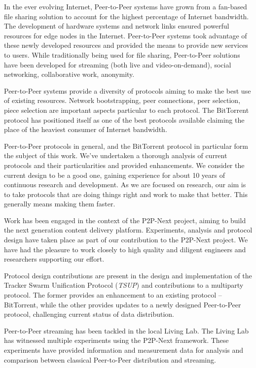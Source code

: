 
In the ever evolving Internet, Peer-to-Peer systems have grown from a
fan-based file sharing solution to account for the highest percentage of
Internet bandwidth. The development of hardware systems and network links
ensured powerful resources for edge nodes in the Internet. Peer-to-Peer
systems took advantage of these newly developed resources and provided the
means to provide new services to users. While traditionally being used for
file sharing, Peer-to-Peer solutions have been developed for streaming (both
live and video-on-demand), social networking, collaborative work, anonymity.

Peer-to-Peer systems provide a diversity of protocols aiming to make the best
use of existing resources. Network bootstrapping, peer connections, peer
selection, piece selection are important aspects particular to each protocol.
The BitTorrent protocol has positioned itself as one of the best protocols
available claiming the place of the heaviest consumer of Internet bandwidth.

Peer-to-Peer protocols in general, and the BitTorrent protocol in particular
form the subject of this work. We've undertaken a thorough analysis of current
protocols and their particularities and provided enhancements. We consider the
current design to be a good one, gaining experience for about 10 years of
continuous research and development. As we are focused on research, our aim is
to take protocols that are doing things right and work to make that better.
This generally means making them faster.

Work has been engaged in the context of the P2P-Next project, aiming to build
the next generation content delivery platform. Experiments, analysis and
protocol design have taken place as part of our contribution to the P2P-Next
project. We have had the pleasure to work closely to high quality and diligent
engineers and researchers supporting our effort.

Protocol design contributions are present in the design and implementation of
the Tracker Swarm Unification Protocol (\textit{TSUP}) and contributions to a
multiparty protocol. The former provides an enhancement to an existing
protocol -- BitTorrent, while the other provides updates to a newly designed
Peer-to-Peer protocol, challenging current status of data distribution.

Peer-to-Peer streaming has been tackled in the local Living Lab. The Living
Lab has witnessed multiple experiments using the P2P-Next framework. These
experiments have provided information and measurement data for analysis and
comparison between classical Peer-to-Peer distribution and streaming.

